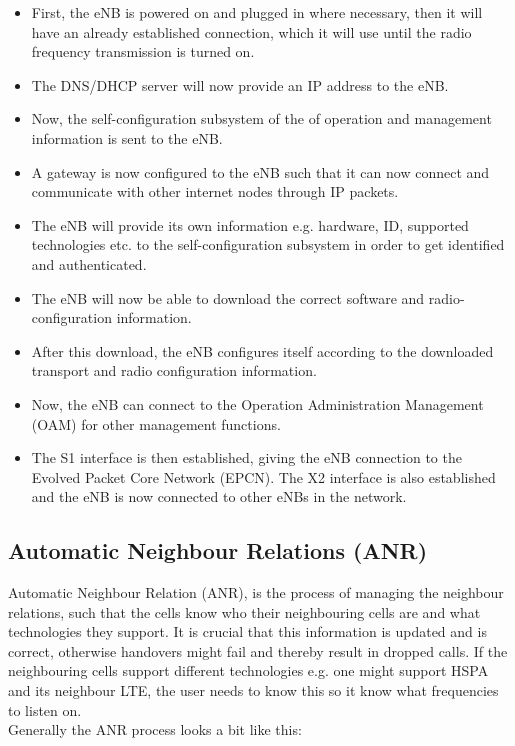 \documentclass{report}
\begin{document}
\begin{itemize}
	\item First, the eNB is powered on and plugged in where necessary, then it will have an already 	established connection, which it will use until the radio frequency transmission is turned on.
	\item The DNS/DHCP server will now provide an IP address to the eNB.
	\item Now, the self-configuration subsystem of the of operation and management information is 		sent to the eNB. 
	\item A gateway is now configured to the eNB such that it can now connect and communicate with other internet nodes through IP packets.
	\item The eNB will provide its own information e.g. hardware, ID, supported technologies etc. to the self-configuration subsystem in order to get identified and authenticated. 
	\item The eNB will now be able to download the correct software and radio-configuration information. 
	\item After this download, the eNB configures itself according to the downloaded transport and radio configuration information. 
	\item Now, the eNB can connect to the Operation Administration Management (OAM) for other management functions.
	\item The S1 interface is then established, giving the eNB connection to the Evolved Packet Core Network (EPCN). The X2 interface is also established and the eNB is now connected to other eNBs in the network. \cite{Atayero2014}
\end{itemize}

\subsection{Automatic Neighbour Relations (ANR)}

Automatic Neighbour Relation (ANR), is the process of managing the neighbour relations, such that the cells know who their neighbouring cells are and what technologies they support. It is crucial that this information is updated and is correct, otherwise handovers might fail and thereby result in dropped calls. If the neighbouring cells support different technologies e.g. one might support HSPA and its neighbour LTE, the user needs to know this so it know what frequencies to listen on. \\ Generally the ANR process looks a bit like this:
\end{document}
